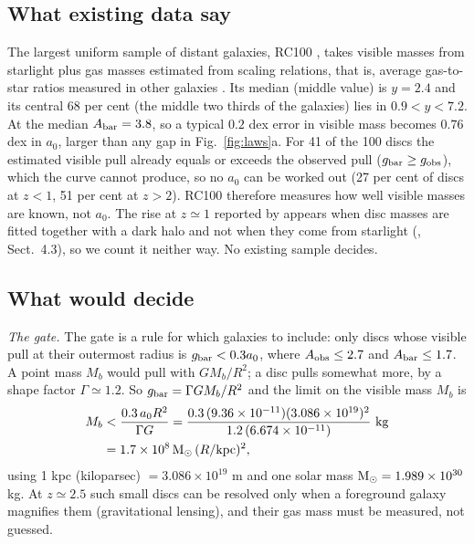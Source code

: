 \documentclass[fleqn,usenatbib]{mnras}
\begin{document}
\subsection{What existing data say}
The largest uniform sample of distant galaxies, RC100 \citep[100 rotation curves of star-forming discs, $0.6<z<2.5$]{NestorShachar2023}, takes visible masses from starlight plus gas masses estimated from scaling relations, that is, average gas-to-star ratios measured in other galaxies \citep{Tacconi2018}. Its median (middle value) is $y=2.4$ and its central 68 per cent (the middle two thirds of the galaxies) lies in $0.9<y<7.2$. At the median $A_{\rm bar}=3.8$, so a typical $0.2$ dex error in visible mass becomes $0.76$ dex in $a_0$, larger than any gap in Fig.~\ref{fig:laws}a. For 41 of the 100 discs the estimated visible pull already equals or exceeds the observed pull ($g_{\rm bar}\ge g_{\rm obs}$), which the curve cannot produce, so no $a_0$ can be worked out (27 per cent of discs at $z<1$, 51 per cent at $z>2$). RC100 therefore measures how well visible masses are known, not $a_0$. The rise at $z\simeq1$ reported by \citet{Ciocan2026} appears when disc masses are fitted together with a dark halo and not when they come from starlight (\citealt{Zimmerman2026long}, Sect.~4.3), so we count it neither way. No existing sample decides.

\subsection{What would decide}
\label{sec:design}
\emph{The gate.} The gate is a rule for which galaxies to include: only discs whose visible pull at their outermost radius is $g_{\rm bar}<0.3a_0$, where $A_{\rm obs}\le2.7$ and $A_{\rm bar}\le1.7$. A point mass $M_b$ would pull with $GM_b/R^2$; a disc pulls somewhat more, by a shape factor $\Gamma\simeq1.2$. So $g_{\rm bar}=\Gamma GM_b/R^2$ and the limit on the visible mass $M_b$ is
\begin{equation}
\begin{aligned}
M_b&<\frac{0.3\,a_0R^2}{\Gamma G}=\frac{0.3\,(9.36\times10^{-11})(3.086\times10^{19})^2}{1.2\,(6.674\times10^{-11})}\ {\rm kg}\\
&=1.7\times10^{8}\,{\rm M_\odot}\,(R/{\rm kpc})^2,
\end{aligned}
\end{equation}
using 1 kpc (kiloparsec) $=3.086\times10^{19}$ m and one solar mass ${\rm M_\odot}=1.989\times10^{30}$ kg. At $z\simeq2.5$ such small discs can be resolved only when a foreground galaxy magnifies them (gravitational lensing), and their gas mass must be measured, not guessed.
\end{document}
